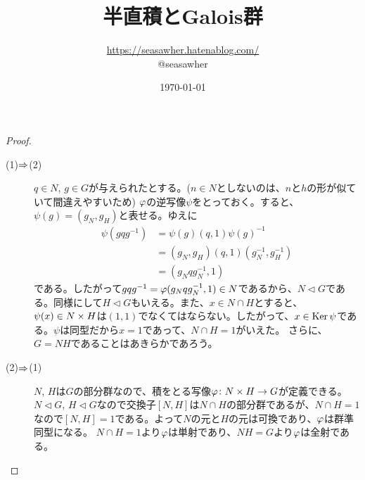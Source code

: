 \documentclass[12pt]{jsarticle}%
\begin{document}
\title{半直積とGalois群}
\author{\url{https://seasawher.hatenablog.com/} \\ @seasawher}
\date{\today}
\maketitle


\begin{proof} ${}$
  \begin{description}
    \item[(1)$\Rightarrow$(2)] $q \in N$, $g \in G$が与えられたとする。($n \in N$としないのは、$n$と$h$の形が似ていて間違えやすいため) ${\varphi}$の逆写像$\psi$をとっておく。すると、$\psi(g) = (g_N, g_H)$と表せる。ゆえに
    \begin{align*}
      \psi(gqg^{-1}) &= \psi(g) (q,1) \psi(g)^{-1} \\
      &= (g_N,g_H) (q,1) (g_N^{-1}, g_H^{-1}) \\
      &= ( g_N q g_N^{-1} , 1)
    \end{align*}
    である。したがって$gqg^{-1} = {\varphi}(g_N q g_N^{-1} , 1) \in N$であるから、$N \lhd G$である。同様にして$H \lhd G$もいえる。また、$x \in N \cap H$とすると、$\psi(x) \in N \times H$は$(1,1)$でなくてはならない。したがって、$x \in \operatorname{Ker} \psi$である。$\psi$は同型だから$x=1$であって、$N \cap H =1$がいえた。
    さらに、$G = NH$であることはあきらかであろう。
    \item[(2)$\Rightarrow$(1)] $N$, $H$は$G$の部分群なので、積をとる写像${\varphi} \colon N \times H \to G$が定義できる。$N \lhd G$, $H \lhd G$なので交換子$[N,H]$は$N \cap H$の部分群であるが、$N \cap H = 1$なので$[N,H] = 1$である。よって$N$の元と$H$の元は可換であり、${\varphi}$は群準同型になる。
    $N \cap H = 1$より${\varphi}$は単射であり、$NH=G$より${\varphi}$は全射である。
  \end{description}
\end{proof}
\end{document}
